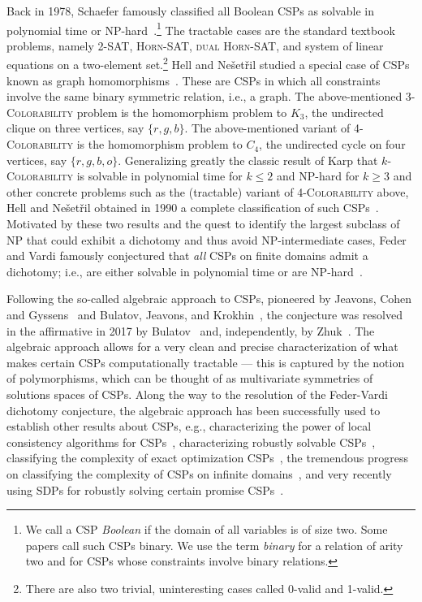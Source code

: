 Back in 1978, Schaefer famously classified all Boolean CSPs as solvable in
polynomial time or NP-hard~\cite{Schaefer78:stoc}.\footnote{We call a CSP
\emph{Boolean} if the domain of all variables is of size two. Some papers call
such CSPs binary. We use the term \emph{binary} for a relation of arity two and
for CSPs whose constraints involve binary relations.} The
tractable cases are the standard textbook problems, namely 
\textsc{2-SAT}, \textsc{Horn-SAT}, \textsc{dual
Horn-SAT}, and system of linear equations on a two-element set.\footnote{There
are also two trivial, uninteresting cases called 0-valid and 1-valid.} 
Hell and Ne\v{s}et\v{r}il studied a special case of CSPs known
as graph homomorphisms~\cite{hell2004graphs}. These are CSPs in which all constraints
involve the same binary symmetric relation, i.e., a graph. The above-mentioned 
\textsc{3-Colorability} problem is the homomorphism problem to $K_3$,
the undirected clique on three vertices, say $\{r,g,b\}$. The above-mentioned
variant of \textsc{4-Colorability} is the homomorphism problem to $C_4$, the
undirected cycle on four vertices, say $\{r,g,b,o\}$. Generalizing greatly
the classic result of Karp that \textsc{$k$-Colorability} is solvable in polynomial time for $k\leq 2$ and NP-hard
for $k\geq 3$ and other concrete problems such as the (tractable) variant of
\textsc{4-Colorability} above, Hell and Ne\v{s}et\v{r}il obtained in
1990 a complete classification of such CSPs~\cite{HellN90}.
%
Motivated by these two results and the quest to identify the largest subclass of
NP that could exhibit a dichotomy and thus avoid NP-intermediate cases, Feder
and Vardi famously conjectured that \emph{all} CSPs on finite domains admit a
dichotomy; i.e., are either solvable in polynomial time or are
NP-hard~\cite{Feder98:monotone}.

Following the so-called algebraic approach to CSPs, pioneered by Jeavons, Cohen
and Gyssens~\cite{Jeavons97:closure} and Bulatov, Jeavons, and
Krokhin~\cite{Bulatov05:classifying}, the conjecture was resolved in the
affirmative in 2017 by Bulatov~\cite{Bulatov17:focs} and, independently,
by Zhuk~\cite{Zhuk17:focs,Zhuk20:jacm}. The algebraic approach allows for a very clean and
precise characterization of what makes certain CSPs computationally tractable
--- this is captured by the notion of polymorphisms, which can be thought of as
multivariate symmetries of solutions spaces of CSPs.
%
Along the way to the resolution of the Feder-Vardi dichotomy conjecture, the
algebraic approach has been successfully used to
establish other results about CSPs, 
e.g., characterizing the power of local consistency
algorithms for CSPs~\cite{Bulatov09:width,Barto14:local}, characterizing robustly solvable
CSPs~\cite{Guruswami12:tght,Dalmau13:toct,Barto16:sicomp}, classifying the
complexity of exact optimization CSPs~\cite{tz16:jacm,Kolmogorov17:sicomp}, the
tremendous progress on classifying the complexity of CSPs on infinite
domains~\cite{Bodirsky2021complexity}, and very recently using SDPs for robustly
solving certain promise CSPs~\cite{BGS23:stoc}.

